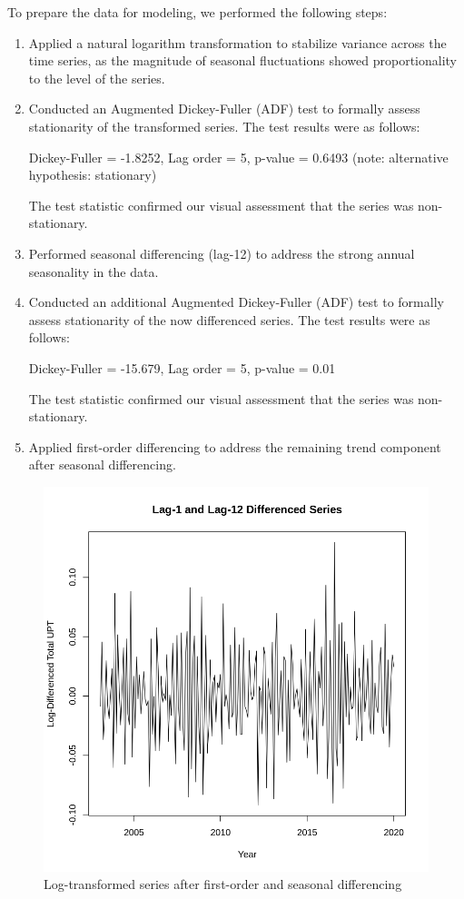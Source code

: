 \documentclass[11pt]{article}
\begin{document}
To prepare the data for modeling, we performed the following steps:

\begin{enumerate}
  \item Applied a natural logarithm transformation to stabilize variance across the time series, as the magnitude of seasonal fluctuations showed proportionality to the level of the series.
  
  \item Conducted an Augmented Dickey-Fuller (ADF) test to formally assess stationarity of the transformed series. The test results were as follows:
  
  Dickey-Fuller = -1.8252, Lag order = 5, p-value = 0.6493 (note: alternative hypothesis: stationary)
  
  The test statistic confirmed our visual assessment that the series was non-stationary.
  
  \item Performed seasonal differencing (lag-12) to address the strong annual seasonality in the data.
  
  \item Conducted an additional Augmented Dickey-Fuller (ADF) test to formally assess stationarity of the now differenced series. The test results were as follows:
  
  Dickey-Fuller = -15.679, Lag order = 5, p-value = 0.01
  
  The test statistic confirmed our visual assessment that the series was non-stationary.
  
  \item Applied first-order differencing to address the remaining trend component after seasonal differencing.
\end{enumerate}

\begin{figure}[!ht]
\centering
\includegraphics[width=0.525\linewidth]{diff_series.png}
\caption{Log-transformed series after first-order and seasonal differencing}
\label{f:diff_series}
\end{figure}
\end{document}
